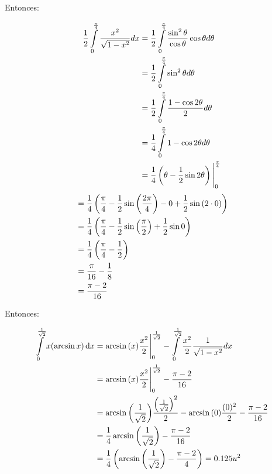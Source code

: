 \documentclass[11pt]{report}
\begin{document}
Entonces:

\begin{equation}
\begin{split}
        \frac{1}{2} \int \limits_0^{\frac{\pi}{4}} \frac{x^2}{\sqrt{1 - x^2}} dx \notag
        &= \frac{1}{2} \int \limits_0^{\frac{\pi}{4}} \frac{\sin^2{\theta}}{\cos{\theta}} \cos{\theta} d\theta \\ \notag
        &= \frac{1}{2} \int \limits_0^{\frac{\pi}{4}} \sin^2{\theta} d\theta \\ \notag
        &= \frac{1}{2} \int \limits_0^{\frac{\pi}{4}} \frac{1 - \cos{2\theta}}{2} d\theta \\ \notag
        &= \frac{1}{4} \int \limits_0^{\frac{\pi}{4}} 1 - \cos{2\theta} d\theta \\ \notag
        &= \frac{1}{4} \left( \theta - \frac{1}{2} \sin{2\theta} \right) \Bigg|_0^{\frac{\pi}{4}}
\end{split}
\end{equation}
\begin{equation}
\begin{split}
        &= \frac{1}{4} \left( \frac{\pi}{4} - \frac{1}{2}\sin{\left(\frac{2\pi}{4} \right)} - 0 + \frac{1}{2} \sin{(2 \cdot 0)} \right)  \\ \notag
        &= \frac{1}{4} \left( \frac{\pi}{4} - \frac{1}{2}\sin{\left(\frac{\pi}{2} \right)} + \frac{1}{2} \sin{0} \right)  \\ \notag
        &= \frac{1}{4} \left( \frac{\pi}{4} - \frac{1}{2} \right)  \\ \notag
        &= \frac{\pi}{16} - \frac{1}{8}  \\ \notag
        &= \frac{\pi - 2}{16}
\end{split}
\end{equation}

Entonces:

\begin{equation}
\begin{split}
        \int \limits_0^{\frac{1}{\sqrt{2}}} x (\arcsin{x}) \, \text dx
        &= \arcsin{(x)} \frac{x^2}{2} \Bigg|_0^{\frac{1}{\sqrt{2}}}
        - \int \limits_0^{\frac{1}{\sqrt{2}}} \frac{x^2}{2} \frac{1}{\sqrt{1 - x^2}} dx \\ \notag
        &= \arcsin{(x)} \frac{x^2}{2} \Bigg|_0^{\frac{1}{\sqrt{2}}} - \frac{\pi - 2}{16} \\ \notag
        &= \arcsin{ \left( \frac{1}{\sqrt{2}} \right)} \frac{ \left( \frac{1}{\sqrt{2}} \right)^2}{2}
        - \arcsin{(0)} \frac{(0)^2}{2} - \frac{\pi - 2}{16} \\ \notag
        &=  \frac{1}{4} \arcsin{ \left( \frac{1}{\sqrt{2}} \right)}
         - \frac{\pi - 2}{16} \\ \notag
        &=  \frac{1}{4} \left( \arcsin{ \left( \frac{1}{\sqrt{2}} \right)}
         - \frac{\pi - 2}{4} \right) = 0.125 u^2 \\ \notag
\end{split}
\end{equation}
\end{document}
